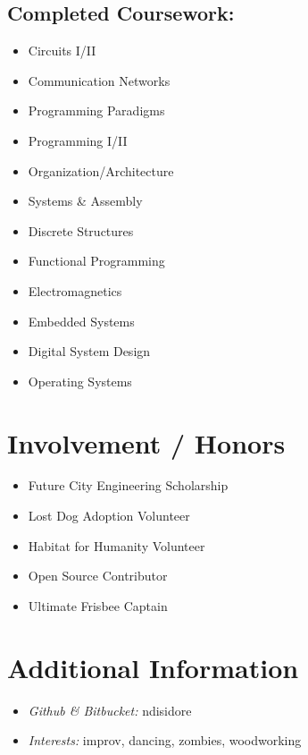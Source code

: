 \documentclass[10pt]{extarticle}
\begin{document}
\subsection*{Completed Coursework:}
\begin{multicols}{4}
  \begin{itemize}
    \item Circuits I/II
    \item Communication Networks
    \item Programming Paradigms
    \item Programming I/II
    \item Organization/Architecture
    \item Systems \& Assembly
    \item Discrete Structures
    \item Functional Programming
    \item Electromagnetics
    \item Embedded Systems
    \item Digital System Design
    \item Operating Systems
  \end{itemize}
\end{multicols}

\section*{Involvement / Honors}
\begin{multicols}{3}
  \begin{itemize}
    \item Future City Engineering Scholarship
    \item Lost Dog Adoption Volunteer
    \item Habitat for Humanity Volunteer
    \item Open Source Contributor
    \item Ultimate Frisbee Captain
  \end{itemize}
\end{multicols}

\section*{Additional Information}
\begin{multicols}{2}
  \begin{itemize}
    \item \textit{Github \& Bitbucket:} ndisidore
    \item \textit{Interests:} improv, dancing, zombies, woodworking
  \end{itemize}
\end{multicols}
\end{document}
